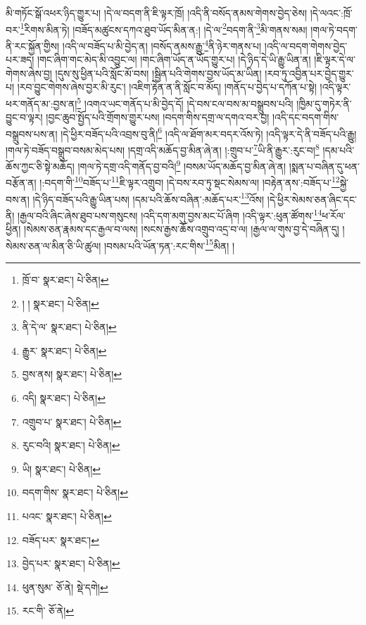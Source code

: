 མི་གཏོང་སྒོ་འཕར་ཉིད་གྱུར་པ། །དེ་ལ་བདག་ནི་ཇི་ལྟར་ཁྲོ། །འདི་ནི་བསོད་ནམས་གེགས་བྱེད་ཅེས། །དེ་ལའང་:ཁྲོ་བར་\footnote{ཁྲོ་བ་  སྣར་ཐང་།  པེ་ཅིན། }རིགས་མིན་ཏེ། །བཟོད་མཚུངས་དཀའ་ཐུབ་ཡོད་མིན་ན:། །དེ་ལ་\footnote{། །  སྣར་ཐང་།  པེ་ཅིན། }བདག་ནི་\footnote{ནི་དེ་ལ་  སྣར་ཐང་།  པེ་ཅིན། }མི་གནས་སམ། །གལ་ཏེ་བདག་ནི་རང་སྐྱོན་གྱིས། །འདི་ལ་བཟོད་པ་མི་བྱེད་ན། །བསོད་ནམས་རྒྱུ་\footnote{རྒྱུར་  སྣར་ཐང་།  པེ་ཅིན། }ནི་ཉེར་གནས་པ། །འདི་ལ་བདག་གེགས་བྱེད་པར་ཟད། །གང་ཞིག་གང་མེད་མི་འབྱུང་ལ། །གང་ཞིག་ཡོད་ན་ཡོད་གྱུར་པ། །དེ་ཉིད་དེ་ཡི་རྒྱུ་ཡིན་ན། །ཇི་ལྟར་དེ་ལ་གེགས་ཞེས་བྱ། །དུས་སུ་ཕྱིན་པའི་སློང་མོ་བས། །སྦྱིན་པའི་གེགས་བྱས་ཡོད་མ་ཡིན། །རབ་ཏུ་འབྱིན་པར་བྱེད་གྱུར་པ། །རབ་བྱུང་གེགས་ཞེས་བྱར་མི་རུང་། །འཇིག་རྟེན་ན་ནི་སློང་བ་མོད། །གནོད་པ་བྱེད་པ་དཀོན་པ་སྟེ། །འདི་ལྟར་ཕར་གནོད་མ་:བྱས་ན།\footnote{བྱས་ནས།  སྣར་ཐང་།  པེ་ཅིན། } །འགའ་ཡང་གནོད་པ་མི་བྱེད་དོ། །དེ་བས་ངལ་བས་མ་བསྒྲུབས་པའི། །ཁྱིམ་དུ་གཏེར་ནི་བྱུང་བ་ལྟར། །བྱང་ཆུབ་སྤྱོད་པའི་གྲོགས་གྱུར་པས། །བདག་གིས་དགྲ་ལ་དགའ་བར་བྱ། །འདི་དང་བདག་གིས་བསྒྲུབས་པས་ན། །དེ་ཕྱིར་བཟོད་པའི་འབྲས་བུ་ནི།\footnote{འདི།  སྣར་ཐང་།  པེ་ཅིན། } །འདི་ལ་ཐོག་མར་བདར་འོས་ཏེ། །འདི་ལྟར་དེ་ནི་བཟོད་པའི་རྒྱུ། །གལ་ཏེ་བཟོད་བསྒྲུབ་བསམ་མེད་པས། །དགྲ་འདི་མཆོད་བྱ་མིན་ཞེ་ན། །:གྲུབ་པ་\footnote{འགྲུབ་པ་  སྣར་ཐང་།  པེ་ཅིན། }ཡི་ནི་རྒྱུར་:རུང་བ།\footnote{རུང་བའི།  སྣར་ཐང་།  པེ་ཅིན། } །དམ་པའི་ཆོས་ཀྱང་ཅི་སྟེ་མཆོད། །གལ་ཏེ་དགྲ་འདི་གནོད་བྱ་བའི།\footnote{ཡི།  སྣར་ཐང་།  པེ་ཅིན། } །བསམ་ཡོད་མཆོད་བྱ་མིན་ཞེ་ན། །སྨན་པ་བཞིན་དུ་ཕན་བརྩོན་ན། །:བདག་གི་\footnote{བདག་གིས་  སྣར་ཐང་།  པེ་ཅིན། }བཟོད་པ་\footnote{པའང་  སྣར་ཐང་།  པེ་ཅིན། }ཇི་ལྟར་འགྲུབ། །དེ་བས་རབ་ཏུ་སྡང་སེམས་ལ། །བརྟེན་ནས་:བཟོད་པ་\footnote{བཟོད་པར་  སྣར་ཐང་། }སྐྱེ་བས་ན། །དེ་ཉིད་བཟོད་པའི་རྒྱུ་ཡིན་པས། །དམ་པའི་ཆོས་བཞིན་:མཆོད་པར་\footnote{བྱེད་པར་  སྣར་ཐང་།  པེ་ཅིན། }འོས། །དེ་ཕྱིར་སེམས་ཅན་ཞིང་དང་ནི། །རྒྱལ་བའི་ཞིང་ཞེས་ཐུབ་པས་གསུངས། །འདི་དག་མགུ་བྱས་མང་པོ་ཞིག །འདི་ལྟར་:ཕུན་ཚོགས་\footnote{ཕུན་སུམ་  ཅོ་ནེ།  སྡེ་དགེ། }ཕ་རོལ་ཕྱིན། །སེམས་ཅན་རྣམས་དང་རྒྱལ་བ་ལས། །སངས་རྒྱས་ཆོས་འགྲུབ་འདྲ་བ་ལ། །རྒྱལ་ལ་གུས་བྱ་དེ་བཞིན་དུ། །སེམས་ཅན་ལ་མིན་ཅི་ཡི་ཚུལ། །བསམ་པའི་ཡོན་ཏན་:རང་གིས་\footnote{རང་གི་  ཅོ་ནེ། }མིན། །
